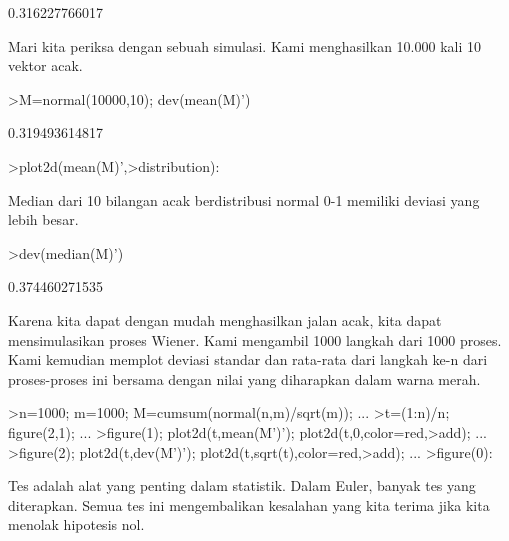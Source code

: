 \documentclass[12pt,Times new roman,letterpaper]{book}
\begin{document}
\begin{eulernootebook}
\begin{eulercomment}
\begin{eulercomment}
\begin{eulernootebook}
\begin{eulercomment}
\begin{eulercomment}
\begin{eulercomment}
\begin{eulercomment}
\begin{eulercomment}
\begin{eulercomment}
\begin{eulercomment}
\begin{eulerprompt}
\end{eulerprompt}
\begin{euleroutput}
  0.316227766017
\end{euleroutput}
\begin{eulercomment}
Mari kita periksa dengan sebuah simulasi. Kami menghasilkan 10.000
kali 10 vektor acak.
\end{eulercomment}
\begin{eulerprompt}
>M=normal(10000,10); dev(mean(M)')
\end{eulerprompt}
\begin{euleroutput}
  0.319493614817
\end{euleroutput}
\begin{eulerprompt}
>plot2d(mean(M)',>distribution):
\end{eulerprompt}
\begin{eulercomment}
Median dari 10 bilangan acak berdistribusi normal 0-1 memiliki deviasi
yang lebih besar.
\end{eulercomment}
\begin{eulerprompt}
>dev(median(M)')
\end{eulerprompt}
\begin{euleroutput}
  0.374460271535
\end{euleroutput}
\begin{eulercomment}
Karena kita dapat dengan mudah menghasilkan jalan acak, kita dapat
mensimulasikan proses Wiener. Kami mengambil 1000 langkah dari 1000
proses. Kami kemudian memplot deviasi standar dan rata-rata dari
langkah ke-n dari proses-proses ini bersama dengan nilai yang
diharapkan dalam warna merah.
\end{eulercomment}
\begin{eulerprompt}
>n=1000; m=1000; M=cumsum(normal(n,m)/sqrt(m)); ...
>t=(1:n)/n; figure(2,1); ...
>figure(1); plot2d(t,mean(M')'); plot2d(t,0,color=red,>add); ...
>figure(2); plot2d(t,dev(M')'); plot2d(t,sqrt(t),color=red,>add); ...
>figure(0):
\end{eulerprompt}
\begin{eulercomment}
Tes adalah alat yang penting dalam statistik. Dalam Euler, banyak tes
yang diterapkan. Semua tes ini mengembalikan kesalahan yang kita
terima jika kita menolak hipotesis nol.


\end{eulercomment}
\end{eulercomment}
\end{eulercomment}
\end{eulercomment}
\end{eulercomment}
\end{eulercomment}
\end{eulercomment}
\end{eulercomment}
\end{eulernootebook}
\end{eulercomment}
\end{eulercomment}
\end{eulernootebook}
\end{document}
